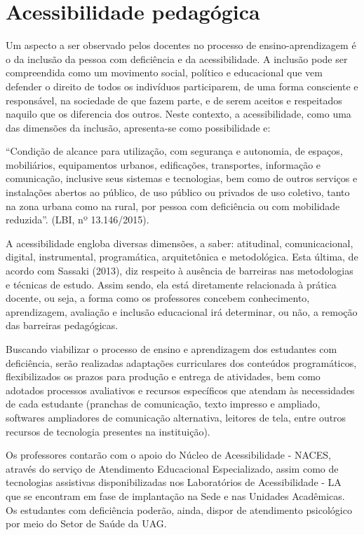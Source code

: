 \documentclass[
	12pt,				%
	openright,			%
  oneside,     %
	a4paper,			%
	chapter=TITLE,		%
	english,			%
	french,				%
	spanish,			%
	brazil				%
	]{abntex2}
\begin{document}
\section{Acessibilidade pedagógica}

Um aspecto a ser observado pelos docentes no processo de ensino-aprendizagem é o da inclusão da pessoa com deficiência e da acessibilidade. A inclusão pode ser compreendida como um movimento social, político e educacional que vem defender o direito de todos os indivíduos participarem, de uma forma consciente e responsável, na sociedade de que fazem parte, e de serem aceitos e respeitados naquilo que os diferencia dos outros. Neste contexto, a acessibilidade, como uma das dimensões da inclusão, apresenta-se como possibilidade e:

\begin{citacao}
    “Condição de alcance para utilização, com segurança e autonomia, de espaços, mobiliários, equipamentos urbanos, edificações, transportes, informação e comunicação, inclusive seus sistemas e tecnologias, bem como de outros serviços e instalações abertos ao público, de uso público ou privados de uso coletivo, tanto na zona urbana como na rural, por pessoa com deficiência ou com mobilidade reduzida”. (LBI, nº 13.146/2015).
\end{citacao}

A acessibilidade engloba diversas dimensões, a saber: atitudinal, comunicacional, digital, instrumental, programática, arquitetônica e metodológica. Esta última, de acordo com Sassaki (2013), diz respeito à ausência de barreiras nas metodologias e técnicas de estudo. Assim sendo, ela está diretamente relacionada à prática docente, ou seja, a forma como os professores concebem conhecimento, aprendizagem, avaliação e inclusão educacional irá determinar, ou não, a remoção das barreiras pedagógicas.

Buscando viabilizar o processo de ensino e aprendizagem dos estudantes com deficiência, serão realizadas adaptações curriculares dos conteúdos programáticos, flexibilizados os prazos para produção e entrega de atividades, bem como adotados processos avaliativos e recursos específicos que atendam às necessidades de cada estudante (pranchas de comunicação, texto impresso e ampliado, softwares ampliadores de comunicação alternativa, leitores de tela, entre outros recursos de tecnologia presentes na instituição).

Os professores contarão com o apoio do Núcleo de Acessibilidade - NACES, através do serviço de Atendimento Educacional Especializado, assim como de tecnologias assistivas disponibilizadas nos Laboratórios de Acessibilidade - LA que se encontram em fase de implantação na Sede e nas Unidades Acadêmicas. Os estudantes com deficiência poderão, ainda, dispor de atendimento psicológico por meio do Setor de Saúde da UAG.
\end{document}

